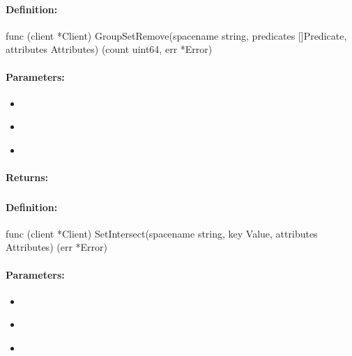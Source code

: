 \paragraph{Definition:}
\begin{gocode}
func (client *Client) GroupSetRemove(spacename string, predicates []Predicate, attributes Attributes) (count uint64, err *Error)
\end{gocode}

\paragraph{Parameters:}
\begin{itemize}[noitemsep]
\item {}\\

\item {}\\

\item {}\\

\end{itemize}

\paragraph{Returns:}


\pagebreak
\subsubsection{}
\label{api:Go:SetIntersect}


\paragraph{Definition:}
\begin{gocode}
func (client *Client) SetIntersect(spacename string, key Value, attributes Attributes) (err *Error)
\end{gocode}

\paragraph{Parameters:}
\begin{itemize}[noitemsep]
\item {}\\

\item {}\\

\item {}\\

\end{itemize}

